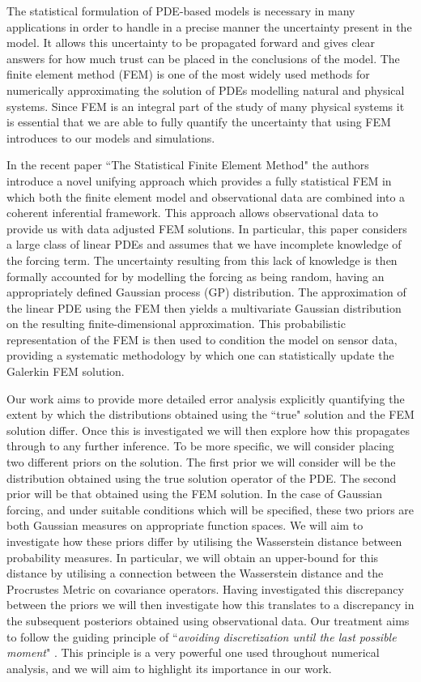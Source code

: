 The statistical formulation of PDE-based models is necessary in many applications in order to handle in a precise manner the uncertainty present in the model. It allows this uncertainty to be propagated forward and gives clear answers for how much trust can be placed in the conclusions of the model. The finite element method (FEM) \textcolor{blue}{\citep{strang1973analysis}} is one of the most widely used methods for numerically approximating the solution of PDEs modelling natural and physical systems. Since FEM is an integral part of the study of many physical systems it is essential that we are able to fully quantify the uncertainty that using FEM introduces to our models and simulations.

In the recent paper ``The Statistical Finite Element Method" \textcolor{blue}{\citep{girolami2019statistical}} the authors introduce a novel unifying approach which provides a fully statistical FEM in which both the finite element model and observational data are combined into a coherent inferential framework. This approach allows observational data to provide us with data adjusted FEM solutions. In particular, this paper considers a large class of linear PDEs and assumes that we have incomplete knowledge of the forcing term. The uncertainty resulting from this lack of knowledge is then formally accounted for by modelling the forcing as being random, having an appropriately defined Gaussian process (GP) distribution. The approximation of the linear PDE using the FEM then yields a multivariate Gaussian distribution on the resulting finite-dimensional approximation. This probabilistic representation of the FEM is then used to condition the model on sensor data, providing a systematic methodology by which one can statistically update the Galerkin FEM solution.

Our work aims to provide more detailed error analysis explicitly quantifying the extent by which the distributions obtained using the ``true" solution and the FEM solution differ. Once this is investigated we will then explore how this propagates through to any further inference. To be more specific, we will consider placing two different priors on the solution. The first prior we will consider will be the distribution obtained using the true solution operator of the PDE. The second prior will be that obtained using the FEM solution. In the case of Gaussian forcing, and under suitable conditions which will be specified, these two priors are both Gaussian measures on appropriate function spaces. We will aim to investigate how these priors differ by utilising the Wasserstein distance between probability measures. In particular, we will obtain an upper-bound for this distance by utilising a connection between the Wasserstein distance and the Procrustes Metric on covariance operators. Having investigated this discrepancy between the priors we will then investigate how this translates to a discrepancy in the subsequent posteriors obtained using observational data. Our treatment aims to follow the guiding principle of ``\textit{avoiding discretization until the last possible moment}" \textcolor{blue}{\citep{stuart2010inverse}}. This principle is a very powerful one used throughout numerical analysis, and we will aim to highlight its importance in our work.


